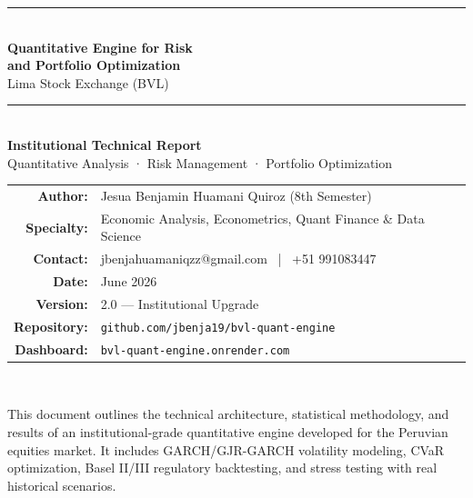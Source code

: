 \documentclass[11pt,a4paper]{article}
\begin{document}
\thispagestyle{empty}
\begin{center}
    \vspace*{1.5cm}
    {\color{accentgold}\rule{\linewidth}{1.5pt}}\\[0.5cm]
    {\Huge\bfseries\color{darkblue} Quantitative Engine for Risk\\[4pt]
    and Portfolio Optimization}\\[0.4cm]
    {\Large\color{darkgray} Lima Stock Exchange (BVL)}\\[0.6cm]
    {\color{accentgold}\rule{\linewidth}{1.5pt}}\\[1cm]

    {\large\bfseries\color{darkblue} Institutional Technical Report}\\[0.3cm]
    {\normalsize\color{darkgray} Quantitative Analysis · Risk Management · Portfolio Optimization}\\[2cm]

    \begin{tabular}{rl}
        \textbf{\color{darkblue}Author:}           & Jesua Benjamin Huamani Quiroz (8th Semester) \\[4pt]
        \textbf{\color{darkblue}Specialty:}       & Economic Analysis, Econometrics, Quant Finance \& Data Science \\[4pt]
        \textbf{\color{darkblue}Contact:}         & jbenjahuamaniqzz@gmail.com ~|~ +51 991083447 \\[4pt]
        \textbf{\color{darkblue}Date:}           & June 2026 \\[4pt]
        \textbf{\color{darkblue}Version:}         & 2.0 — Institutional Upgrade \\[4pt]
        \textbf{\color{darkblue}Repository:}     & \texttt{github.com/jbenja19/bvl-quant-engine} \\[4pt]
        \textbf{\color{darkblue}Dashboard:}       & \texttt{bvl-quant-engine.onrender.com} \\
    \end{tabular}\\[2cm]

    \begin{infobox}[Classification]
    \small This document outlines the technical architecture, statistical methodology, and results
    of an institutional-grade quantitative engine developed for the Peruvian equities market.
    It includes GARCH/GJR-GARCH volatility modeling, CVaR optimization, Basel II/III regulatory
    backtesting, and stress testing with real historical scenarios.
    \end{infobox}
\end{center}
\newpage
\end{document}
